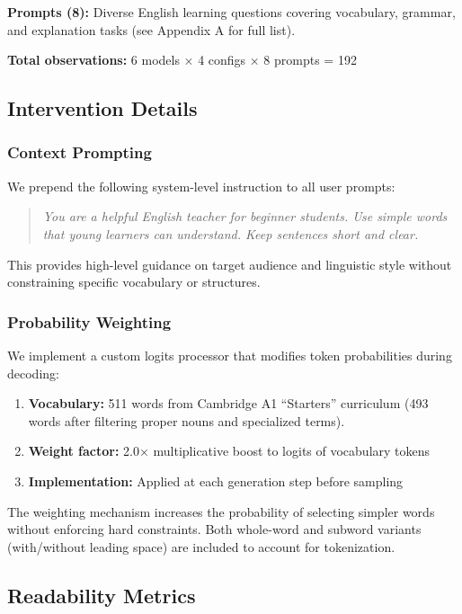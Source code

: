\documentclass[10pt, a4paper]{article}
\begin{document}
\textbf{Prompts (8):} Diverse English learning questions covering vocabulary, grammar, and explanation tasks (see Appendix A for full list).

\textbf{Total observations:} 6 models × 4 configs × 8 prompts = 192

\subsection{Intervention Details}

\subsubsection{Context Prompting}

We prepend the following system-level instruction to all user prompts:

\begin{quote}
\textit{You are a helpful English teacher for beginner students. Use simple words that young learners can understand. Keep sentences short and clear.}
\end{quote}

This provides high-level guidance on target audience and linguistic style without constraining specific vocabulary or structures.

\subsubsection{Probability Weighting}

We implement a custom logits processor that modifies token probabilities during decoding:

\begin{enumerate}
\item \textbf{Vocabulary:} 511 words from Cambridge A1 ``Starters'' curriculum (493 words after filtering proper nouns and specialized terms).
\item \textbf{Weight factor:} 2.0× multiplicative boost to logits of vocabulary tokens
\item \textbf{Implementation:} Applied at each generation step before sampling
\end{enumerate}

The weighting mechanism increases the probability of selecting simpler words without enforcing hard constraints. Both whole-word and subword variants (with/without leading space) are included to account for tokenization.

\subsection{Readability Metrics}
\end{document}
